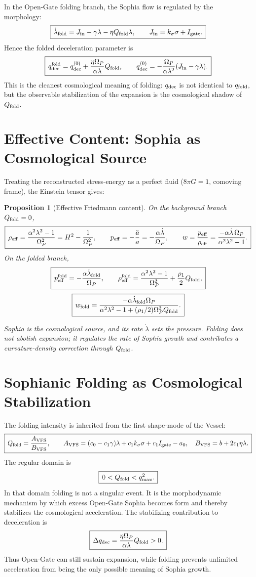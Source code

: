 \documentclass[11pt,a4paper]{article}
\newcommand{\Op}{\Omega_P}
\newcommand{\Igate}{I_{\rm gate}}
\newcommand{\reff}{\rho_{\rm eff}}
\newcommand{\peff}{p_{\rm eff}}
\newcommand{\qdec}{q_{\rm dec}}
\newcommand{\qfold}{q_{\rm fold}}
\newcommand{\Qfold}{Q_{\rm fold}}
\newcommand{\note}[1]{\textcolor{black!65}{\emph{#1}}}
\theoremstyle{plain}
\newtheorem{proposition}{Proposition}
\theoremstyle{remark}
\theoremstyle{definition}
\begin{document}
In the Open-Gate folding branch, the Sophia flow is regulated by the morphology:
\[
\boxed{\,\dot\lambda_{\rm fold}=J_{\rm in}-\gamma\lambda-\eta\Qfold\lambda,\qquad
J_{\rm in}=k_\sigma\sigma+\Igate.\,}
\]
Hence the folded deceleration parameter is
\[
\boxed{\,\qdec^{\rm fold}=\qdec^{(0)}+\frac{\eta\Op}{\alpha\lambda}\Qfold,
\qquad \qdec^{(0)}=-\frac{\Op}{\alpha\lambda^2}(J_{\rm in}-\gamma\lambda).\,}
\]
This is the cleanest cosmological meaning of folding: $\qdec$ is not identical to $\qfold$, but the
observable stabilization of the expansion is the cosmological shadow of $\Qfold$.

\section{Effective Content: Sophia as Cosmological Source}
Treating the reconstructed stress-energy as a perfect fluid ($8\pi G=1$, comoving frame), the Einstein
tensor gives:
\begin{proposition}[Effective Friedmann content]\label{prop:fluid}
On the background branch $\Qfold=0$,
\[
\boxed{\,\reff=\frac{\alpha^2\lambda^2-1}{\Op^2}=H^2-\frac{1}{\Op^2},\qquad
\peff=-\frac{\ddot a}{a}=-\frac{\alpha\dot\lambda}{\Op},\qquad
w=\frac{\peff}{\reff}=\frac{-\alpha\dot\lambda\,\Op}{\alpha^2\lambda^2-1}.\,}
\]
On the folded branch,
\[
\boxed{\,\peff^{\rm fold}=-\frac{\alpha\dot\lambda_{\rm fold}}{\Op},\qquad
\reff^{\rm fold}=\frac{\alpha^2\lambda^2-1}{\Op^2}+\frac{\rho_1}{2}\Qfold,\,}
\]
\[
\boxed{\,w_{\rm fold}=\frac{-\alpha\dot\lambda_{\rm fold}\Op}
{\alpha^2\lambda^2-1+(\rho_1/2)\Op^2\Qfold}.\,}
\]
\end{proposition}
\note{Sophia is the cosmological source, and its \emph{rate} $\dot\lambda$ sets the pressure. Folding
does not abolish expansion; it regulates the rate of Sophia growth and contributes a curvature-density
correction through $\Qfold$.}

\section{Sophianic Folding as Cosmological Stabilization}
The folding intensity is inherited from the first shape-mode of the Vessel:
\[
\boxed{\,\Qfold=\frac{A_{\rm VFS}}{B_{\rm VFS}},\qquad
A_{\rm VFS}=(c_0-c_1\gamma)\lambda+c_1k_\sigma\sigma+c_1\Igate-a_0,
\quad B_{\rm VFS}=b+2c_1\eta\lambda.\,}
\]
The regular domain is
\[
\boxed{\,0<\Qfold<q_{\max}^2.\,}
\]
In that domain folding is not a singular event. It is the morphodynamic mechanism by which excess
Open-Gate Sophia becomes form and thereby stabilizes the cosmological acceleration. The stabilizing
contribution to deceleration is
\[
\boxed{\,\Delta\qdec=\frac{\eta\Op}{\alpha\lambda}\Qfold>0.\,}
\]
Thus Open-Gate can still sustain expansion, while folding prevents unlimited acceleration from being
the only possible meaning of Sophia growth.
\end{document}

